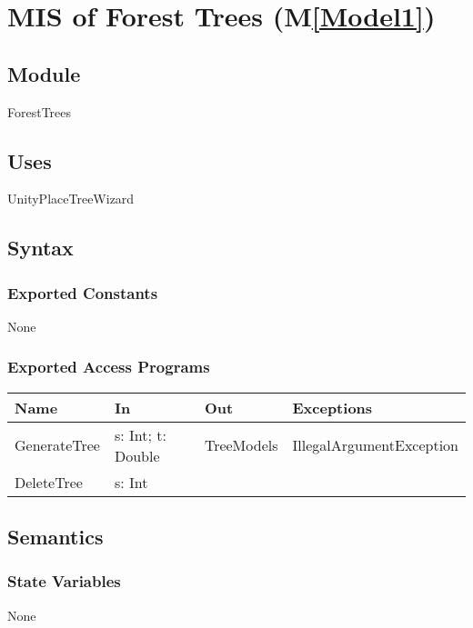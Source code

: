 \documentclass[12pt, titlepage]{article}
\newcommand{\mref}[1]{M\ref{#1}}
\begin{document}
\newpage

\section{MIS of Forest Trees (\mref{Model1})} 

\subsection{Module}

ForestTrees

\subsection{Uses}

UnityPlaceTreeWizard

\subsection{Syntax}

\subsubsection{Exported Constants}
None
\subsubsection{Exported Access Programs}

\begin{center}
\begin{tabular}{|l| l | l | p{5cm}|}
\hline
\textbf{Name} & \textbf{In} & \textbf{Out} & \textbf{Exceptions} \\
\hline
GenerateTree & s: Int; t: Double & TreeModels & IllegalArgumentException \\
\hline
DeleteTree & s: Int &  &  \\
\hline
\end{tabular}
\end{center}

\subsection{Semantics}

\subsubsection{State Variables}
None
\end{document}
